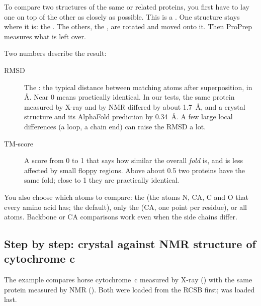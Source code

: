 To compare two structures of the same or related proteins, you first have to
lay one on top of the other as closely as possible. This is a
. One structure stays where it is: the
. The others, the , are rotated and moved onto it.
Then ProPrep measures what is left over.

Two numbers describe the result:
\begin{description}
  \item[RMSD] The : the typical distance
        between matching atoms after superposition, in Å. Near 0 means
        practically identical. In our tests, the same protein measured by X-ray
        and by NMR differed by about 1.7~Å, and a crystal structure and its
        AlphaFold prediction by 0.34~Å. A few large local differences (a loop,
        a chain end) can raise the RMSD a lot.
  \item[TM-score] A score from 0 to 1 that says how similar the overall
        \emph{fold} is, and is less affected by small floppy regions. Above
        about 0.5 two proteins have the same fold; close to 1 they are
        practically identical.
\end{description}

You also choose which atoms to compare: the  (the atoms N, CA,
C and O that every amino acid has; the default), only the 
(CA, one point per residue), or all atoms. Backbone or CA comparisons work even
when the side chains differ.

\subsection{Step by step: crystal against NMR structure of cytochrome c}

The example compares horse cytochrome~c measured by X-ray () with
the same protein measured by NMR (). Both were loaded from the RCSB
first;  was loaded last.

